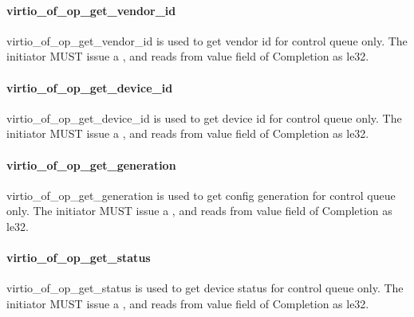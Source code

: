\paragraph{virtio_of_op_get_vendor_id}\label{sec:Virtio Transport Options / Virtio Over Fabrics / Transmission Protocol / Opcodes Definition / virtio_of_op_get_vendor_id}

virtio_of_op_get_vendor_id is used to get vendor id for control queue only. The initiator MUST issue a , and reads from value field of Completion as le32.

\paragraph{virtio_of_op_get_device_id}\label{sec:Virtio Transport Options / Virtio Over Fabrics / Transmission Protocol / Opcodes Definition / virtio_of_op_get_device_id}

virtio_of_op_get_device_id is used to get device id for control queue only. The initiator MUST issue a , and reads from value field of Completion as le32.

\paragraph{virtio_of_op_get_generation}\label{sec:Virtio Transport Options / Virtio Over Fabrics / Transmission Protocol / Opcodes Definition / virtio_of_op_get_generation}

virtio_of_op_get_generation is used to get config generation for control queue only. The initiator MUST issue a , and reads from value field of Completion as le32.

\paragraph{virtio_of_op_get_status}\label{sec:Virtio Transport Options / Virtio Over Fabrics / Transmission Protocol / Opcodes Definition / virtio_of_op_get_status}

virtio_of_op_get_status is used to get device status for control queue only. The initiator MUST issue a , and reads from value field of Completion as le32.

